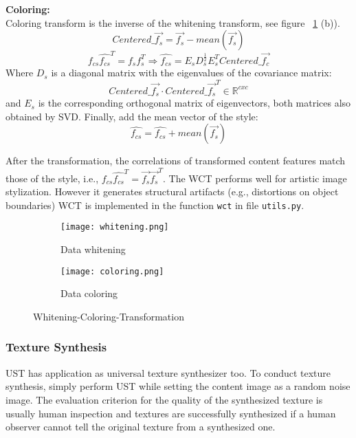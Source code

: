 \textbf{Coloring:}\\
Coloring transform is the inverse of the whitening transform, see figure ~\ref{fig:WCT-vis} (b)).
\begin{equation}
Centered\_\vec{f_s} = \vec{f_s} - mean(\vec{f_s})
\end{equation}
\begin{equation}
\hat{f_{cs}}\hat{f_{cs}}^T=f_sf_s^T \Rightarrow  \hat{f_{cs}} = E_sD_s^{\frac{1}{2}}E_s^TCentered\_\vec{f_c} 
\end{equation}
Where $D_s$ is a diagonal matrix with the eigenvalues of the covariance matrix:  \begin{equation*}
Centered\_\vec{f_s}\cdot Centered\_\vec{f_s}^T \in\mathbb{R}^{cxc}
\end{equation*}
and $E_s$ is the corresponding orthogonal matrix of eigenvectors, both matrices also obtained by SVD. Finally, add the mean vector of the style:
\begin{equation}
\hat{f_{cs}} = \hat{f_{cs}}+mean(\vec{f_s})
\end{equation}

After the transformation, the correlations of transformed content features match those of the style, i.e., $\hat{f_{cs}} \hat{f_{cs}}^T = \vec{f_s} \vec{f_s}^T$.
The WCT performs well for artistic image stylization. However it generates
structural artifacts (e.g., distortions on object boundaries)
WCT is implemented in the function \texttt{wct} in file \texttt{utils.py}.

\begin{figure}[h!]
	\centering
	\begin{subfigure}[b]{0.4\linewidth}
		\texttt{[image: whitening.png]}
		\caption{Data whitening}
	\end{subfigure}
	\begin{subfigure}[b]{0.4\linewidth}
		\texttt{[image: coloring.png]}
		\caption{Data coloring}
	\end{subfigure}
	\caption{Whitening-Coloring-Transformation}
	\label{fig:WCT-vis}
\end{figure}

\subsubsection{Texture Synthesis}\label{subsec:texture}
UST has application as universal texture synthesizer too. To conduct texture synthesis, simply perform UST while setting the content image as a random noise image. The evaluation criterion for the quality of the synthesized texture is usually human inspection and textures are successfully synthesized if a human observer cannot tell the original texture from a synthesized one.

